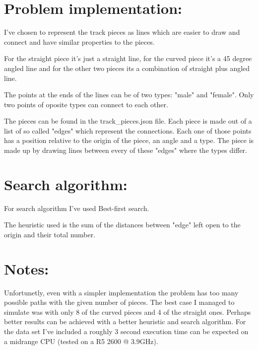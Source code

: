 \documentclass[a4paper, 12pt]{article}
\begin{document}
\section*{Problem implementation:}
I've chosen to represent the track pieces as lines which are easier to draw and connect and have similar
properties to the pieces. \par
For the straight piece it's just a straight line, for the curved piece it's a
45 degree angled line and for the other two pieces its a combination of straight plus angled line. \par
The points at the ends of the lines can be of two types: "male" and "female". Only two points of oposite
types can connect to each other. \par
The pieces can be found in the track\_pieces.json file. Each piece is made out of a list of so called
"edges" which represent the connections. Each one of those points has a position relative to the origin of the piece,
an angle and a type. The piece is made up by drawing lines between every of these "edges" where the types differ.

\section*{Search algorithm:}
For search algorithm I've used Best-first search. \par
The heuristic used is the sum of the distances between "edge" left open to the origin and their total number.

\section*{Notes:}
Unfortunetly, even with a simpler implementation the problem has too many possible paths with the given number of
pieces. The best case I managed to simulate was with only 8 of the curved pieces and 4 of the straight ones.
Perhaps better results can be achieved with a better heuristic and search algorithm. For the data set I've included
a roughly 3 second execution time can be expected on a midrange CPU (tested on a R5 2600 @ 3.9GHz).
\end{document}
